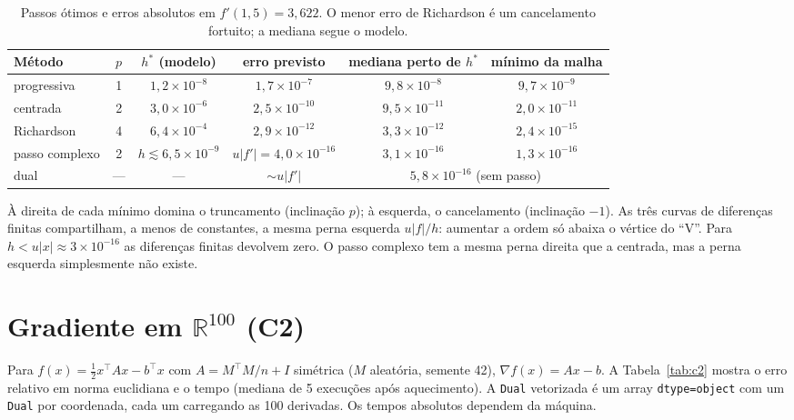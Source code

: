 \documentclass[11pt,a4paper]{article}
\begin{document}
\begin{table}[h]
\centering\small
\setlength{\tabcolsep}{3pt}\begin{tabular}{lccccc}
\toprule
Método & $p$ & $h^\ast$ (modelo) & erro previsto & mediana perto de $h^\ast$ & mínimo da malha \\
\midrule
progressiva & 1 & $1{,}2\times10^{-8}$ & $1{,}7\times10^{-7}$ & $9{,}8\times10^{-8}$ & $9{,}7\times10^{-9}$ \\
centrada & 2 & $3{,}0\times10^{-6}$ & $2{,}5\times10^{-10}$ & $9{,}5\times10^{-11}$ & $2{,}0\times10^{-11}$ \\
Richardson & 4 & $6{,}4\times10^{-4}$ & $2{,}9\times10^{-12}$ & $3{,}3\times10^{-12}$ & $2{,}4\times10^{-15}$ \\
passo complexo & 2 & $h\lesssim6{,}5\times10^{-9}$ & $u|f'|=4{,}0\times10^{-16}$ & $3{,}1\times10^{-16}$ & $1{,}3\times10^{-16}$ \\
dual & --- & --- & $\sim u|f'|$ & \multicolumn{2}{c}{$5{,}8\times10^{-16}$ (sem passo)} \\
\bottomrule
\end{tabular}
\caption{Passos ótimos e erros absolutos em $f'(1{,}5)=3{,}622$. O menor erro de Richardson é um cancelamento fortuito; a mediana segue o modelo.}
\label{tab:c1}
\end{table}

À direita de cada mínimo domina o truncamento (inclinação $p$); à esquerda, o cancelamento (inclinação $-1$). As três curvas de diferenças finitas compartilham, a menos de constantes, a mesma perna esquerda $u|f|/h$: aumentar a ordem só abaixa o vértice do ``V''. Para $h<u|x|\approx 3\times10^{-16}$ as diferenças finitas devolvem zero. O passo complexo tem a mesma perna direita que a centrada, mas a perna esquerda simplesmente não existe.

\section{Gradiente em $\mathbb{R}^{100}$ (C2)}
\label{sec:c2}

Para $f(x)=\frac12x^\top Ax-b^\top x$ com $A=M^\top M/n+I$ simétrica ($M$ aleatória, semente 42), $\nabla f(x)=Ax-b$. A Tabela~\ref{tab:c2} mostra o erro relativo em norma euclidiana e o tempo (mediana de 5 execuções após aquecimento). A \texttt{Dual} vetorizada é um array \texttt{dtype=object} com um \texttt{Dual} por coordenada, cada um carregando as 100 derivadas. Os tempos absolutos dependem da máquina.
\end{document}
